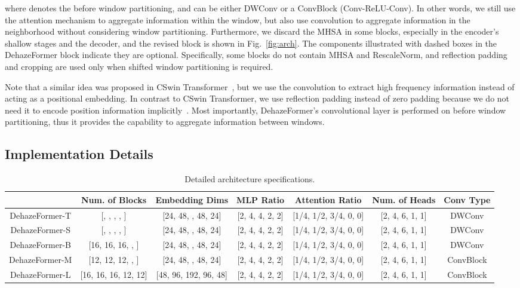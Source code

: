 \documentclass[journal]{IEEEtran}
\begin{document}
where  denotes the  before window partitioning, and  can be either DWConv or a ConvBlock (Conv-ReLU-Conv).
In other words, we still use the attention mechanism to aggregate information within the window, but also use convolution to aggregate information in the neighborhood without considering window partitioning.
Furthermore, we discard the MHSA in some blocks, especially in the encoder's shallow stages and the decoder, and the revised block is shown in Fig.~\ref{fig:arch}.
The components illustrated with dashed boxes in the DehazeFormer block indicate they are optional.
Specifically, some blocks do not contain MHSA and RescaleNorm, and reflection padding and cropping are used only when shifted window partitioning is required.

Note that a similar idea was proposed in CSwin Transformer~\cite{dong2021cswin}, but we use the convolution to extract high frequency information instead of acting as a positional embedding.
In contrast to CSwin Transformer, we use reflection padding instead of zero padding because we do not need it to encode position information implicitly~\cite{islam2020much}.
Most importantly, DehazeFormer's convolutional layer is performed on  before window partitioning, thus it provides the capability to aggregate information between windows.

\subsection{Implementation Details}

\begin{table*}[!t]
\centering
\caption{
    Detailed architecture specifications.
}
\label{tab:arch}
\begin{center}
    \renewcommand\arraystretch{1.25}
    {
    \begin{tabular}{|ccccccc|}
    \hline
    & Num. of Blocks & Embedding Dims & MLP Ratio & Attention Ratio & Num. of Heads & Conv Type \\
    \hline
    \hline
    DehazeFormer-T & [\enspace 4, \enspace 4, \enspace 4, \enspace 2, \enspace 2] & [24, 48, \enspace 96, 48, 24] & [2, 4, 4, 2, 2] & [1/4, 1/2, 3/4, 0, 0] & [2, 4, 6, 1, 1] & DWConv \\
    DehazeFormer-S & [\enspace 8, \enspace 8, \enspace 8, \enspace 4, \enspace 4] & [24, 48, \enspace 96, 48, 24] & [2, 4, 4, 2, 2] & [1/4, 1/2, 3/4, 0, 0] & [2, 4, 6, 1, 1] & DWConv \\
    DehazeFormer-B & [16, 16, 16, \enspace 8, \enspace 8] & [24, 48, \enspace 96, 48, 24] & [2, 4, 4, 2, 2] & [1/4, 1/2, 3/4, 0, 0] & [2, 4, 6, 1, 1] & DWConv \\
    DehazeFormer-M & [12, 12, 12, \enspace 6, \enspace 6] & [24, 48, \enspace 96, 48, 24] & [2, 4, 4, 2, 2] & [1/4, 1/2, 3/4, 0, 0] & [2, 4, 6, 1, 1] & ConvBlock \\
    DehazeFormer-L & [16, 16, 16, 12, 12] & [48, 96, 192, 96, 48] & [2, 4, 4, 2, 2] & [1/4, 1/2, 3/4, 0, 0] & [2, 4, 6, 1, 1] & ConvBlock \\
    \hline
    \end{tabular}
    }
\end{center}
\end{table*}
\end{document}
